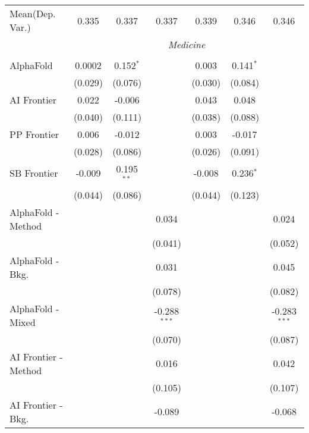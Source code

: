 \begin{tabular}{lcccccc}
Mean(Dep. Var.) & 0.335 & 0.337 & 0.337 & 0.339 & 0.346 & 0.346 \\
 & \multicolumn{6}{c}{\textit{Medicine}} \\ \\
   AlphaFold            & 0.0002  & 0.152$^{*}$  &                & 0.003   & 0.141$^{*}$ &   \\   
                        & (0.029) & (0.076)      &                & (0.030) & (0.084)     &   \\   
   AI Frontier          & 0.022   & -0.006       &                & 0.043   & 0.048       &   \\   
                        & (0.040) & (0.111)      &                & (0.038) & (0.088)     &   \\   
   PP Frontier          & 0.006   & -0.012       &                & 0.003   & -0.017      &   \\   
                        & (0.028) & (0.086)      &                & (0.026) & (0.091)     &   \\   
   SB Frontier          & -0.009  & 0.195$^{**}$ &                & -0.008  & 0.236$^{*}$ &   \\   
                        & (0.044) & (0.086)      &                & (0.044) & (0.123)     &   \\   
   AlphaFold - Method   &         &              & 0.034          &         &             & 0.024\\   
                        &         &              & (0.041)        &         &             & (0.052)\\   
   AlphaFold - Bkg.     &         &              & 0.031          &         &             & 0.045\\   
                        &         &              & (0.078)        &         &             & (0.082)\\   
   AlphaFold - Mixed    &         &              & -0.288$^{***}$ &         &             & -0.283$^{***}$\\   
                        &         &              & (0.070)        &         &             & (0.087)\\   
   AI Frontier - Method &         &              & 0.016          &         &             & 0.042\\   
                        &         &              & (0.105)        &         &             & (0.107)\\   
   AI Frontier - Bkg.   &         &              & -0.089         &         &             & -0.068\\   

\end{tabular}
